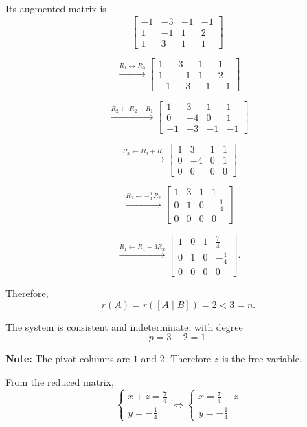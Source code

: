 \begin{enumerate}[label=\alph*)]
\begin{answer}
    Its augmented matrix is
    $$
    \left[
    \begin{array}{ccc|c}
    -1&-3&-1&-1\\
    1&-1&1&2\\
    1&3&1&1
    \end{array}
    \right].
    $$

    $$
    \xrightarrow{R_1\leftrightarrow R_3}
    \left[
    \begin{array}{ccc|c}
    1&3&1&1\\
    1&-1&1&2\\
    -1&-3&-1&-1
    \end{array}
    \right]
    $$

    $$
    \xrightarrow{R_2\leftarrow R_2-R_1}
    \left[
    \begin{array}{ccc|c}
    1&3&1&1\\
    0&-4&0&1\\
    -1&-3&-1&-1
    \end{array}
    \right]
    $$

    $$
    \xrightarrow{R_3\leftarrow R_3+R_1}
    \left[
    \begin{array}{ccc|c}
    1&3&1&1\\
    0&-4&0&1\\
    0&0&0&0
    \end{array}
    \right]
    $$

    $$
    \xrightarrow{R_2\leftarrow-\frac14 R_2}
    \left[
    \begin{array}{ccc|c}
    1&3&1&1\\
    0&1&0&-\frac14\\
    0&0&0&0
    \end{array}
    \right]
    $$

    $$
    \xrightarrow{R_1\leftarrow R_1-3R_2}
    \left[
    \begin{array}{ccc|c}
    1&0&1&\frac74\\
    0&1&0&-\frac14\\
    0&0&0&0
    \end{array}
    \right].
    $$

    Therefore,
    $$
    r(A)=r([A\mid B])=2<3=n.
    $$

    The system is consistent and
    indeterminate, with degree
    $$
    p=3-2=1.
    $$

    {\color{red}
    \textbf{Note:} The pivot columns
    are $1$ and $2$. Therefore $z$
    is the free variable.
    }

    From the reduced matrix,
    $$
    \begin{cases}
    x+z=\frac74\\
    y=-\frac14
    \end{cases}
    \iff
    \begin{cases}
    x=\frac74-z\\
    y=-\frac14
    \end{cases}
    $$


\end{answer}
\end{enumerate}
